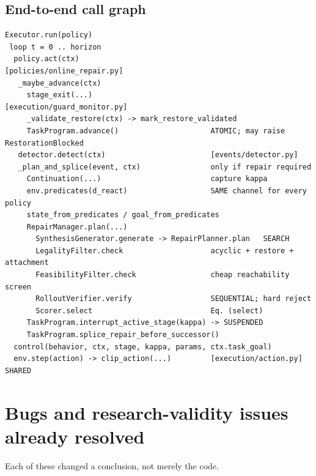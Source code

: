 \documentclass[11pt]{article}
\begin{document}
\subsection{End-to-end call graph}

\begin{lstlisting}
Executor.run(policy)
 loop t = 0 .. horizon
  policy.act(ctx)                              [policies/online_repair.py]
   _maybe_advance(ctx)
     stage_exit(...)                           [execution/guard_monitor.py]
     _validate_restore(ctx) -> mark_restore_validated
     TaskProgram.advance()                     ATOMIC; may raise RestorationBlocked
   detector.detect(ctx)                        [events/detector.py]
   _plan_and_splice(event, ctx)                only if repair required
     Continuation(...)                         capture kappa
     env.predicates(d_react)                   SAME channel for every policy
     state_from_predicates / goal_from_predicates
     RepairManager.plan(...)
       SynthesisGenerator.generate -> RepairPlanner.plan   SEARCH
       LegalityFilter.check                    acyclic + restore + attachment
       FeasibilityFilter.check                 cheap reachability screen
       RolloutVerifier.verify                  SEQUENTIAL; hard reject
       Scorer.select                           Eq. (select)
     TaskProgram.interrupt_active_stage(kappa) -> SUSPENDED
     TaskProgram.splice_repair_before_successor()
  control(behavior, ctx, stage, kappa, params, ctx.task_goal)
  env.step(action) -> clip_action(...)         [execution/action.py] SHARED
\end{lstlisting}

\section{Bugs and research-validity issues already resolved}

Each of these changed a conclusion, not merely the code.
\end{document}
